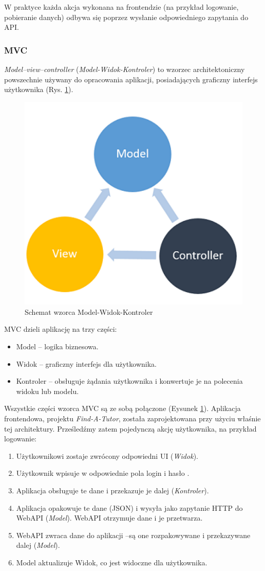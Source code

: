 \documentclass[12pt]{article}
\numberwithin{figure}{section}
\begin{document}
\begin{sloppypar}
W praktyce każda akcja wykonana na frontendzie (na przykład logowanie, pobieranie danych) odbywa się poprzez wysłanie odpowiedniego zapytania do API. 
    
\subsubsection{MVC}
\textit{Model–view–controller} (\textit{Model-Widok-Kontroler}) to wzorzec architektoniczny powszechnie używany do opracowania aplikacji, posiadających graficzny interfejs użytkownika (Rys. \ref{fig:mvc}). 

\begin{figure}[H] 
    \centering
    \includegraphics[width=.48\textwidth]{images/chapter_3/mvc.png}
    \caption{Schemat wzorca Model-Widok-Kontroler \cite{mvc}}
    \label{fig:mvc}
\end{figure}
    
MVC dzieli aplikację na trzy części:
\begin{itemize}
    \item Model -- logika biznesowa.
    \item Widok -- graficzny interfejs dla użytkownika.
    \item Kontroler -- obsługuje żądania użytkownika i konwertuje je na polecenia widoku lub modelu.
\end{itemize}
    
Wszystkie części wzorca MVC są ze sobą połączone (Eysunek \ref{fig:mvc}).
Aplikacja frontendowa, projektu \textit{Find-A-Tutor}, została zaprojektowana przy użyciu właśnie tej architektury. 
Prześledźmy zatem pojedynczą akcję użytkownika, na przykład logowanie:
\begin{enumerate}
    \item Użytkownikowi zostaje zwrócony odpowiedni UI (\textit{Widok}).
    \item Użytkownik wpisuje w odpowiednie pola login i hasło .
    \item Aplikacja obsługuje te dane i przekazuje je dalej (\textit{Kontroler}).
    \item Aplikacja opakowuje te dane (JSON) i wysyła jako zapytanie HTTP do WebAPI (\textit{Model}). WebAPI otrzymuje dane i je przetwarza.
    \item WebAPI zwraca dane do aplikacji --są one rozpakowywane i przekazywane dalej (\textit{Model}).
    \item Model aktualizuje Widok, co jest widoczne dla użytkownika.
\end{enumerate}
    

\end{sloppypar}
\end{document}
